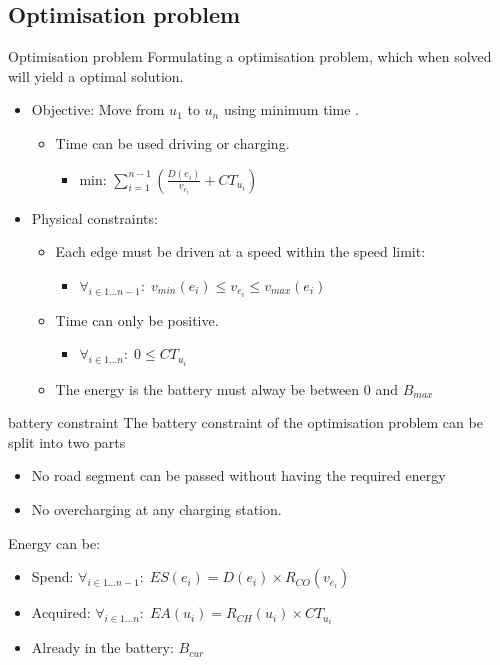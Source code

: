 \subsection{Optimisation problem}
\begin{frame}{Optimisation problem}
Formulating a optimisation problem, which when solved will yield a optimal solution. 
\begin{itemize}
\item Objective: Move from $u_1$ to $u_n$ using minimum time . 
\begin{itemize}
\item Time can be used driving or charging. 
\begin{itemize}
\item $\text{min: } \sum_{i=1}^{n-1} \left(\frac{D(e_i)}{v_{e_i}} + CT_{u_i} \right)$
\end{itemize}
\end{itemize}
\item Physical constraints:
\begin{itemize}
\item Each edge must be driven at a speed within the speed limit:\begin{itemize}
\item $\forall_{i\in1 \dots n-1 }:\;v_{min}(e_i) \leq v_{e_i} \leq v_{max}(e_i)$
\end{itemize}
\item Time can only be positive.\begin{itemize}
\item $\forall_{i\in1 \dots n }:\; 0 \leq CT_{u_i} $
\end{itemize}

\item The energy is the battery must alway be between 0 and $B_{max}$
\end{itemize}
\end{itemize} 
\end{frame}
\begin{frame}{battery constraint}
The battery constraint of the optimisation problem can be split into two parts
\begin{itemize}
\item No road segment can be passed without having the required energy
\item No overcharging at any charging station. 
\end{itemize}
Energy can be:
\begin{itemize}
\item Spend: $\forall_{i\in1 \dots n-1 }:\; ES(e_i) = D(e_i) \times R_{CO}(v_{e_i})$
\item Acquired: $\forall_{i\in1 \dots n }:\; EA(u_i) = R_{CH}(u_i) \times CT_{u_i}$
\item Already in the battery: $B_{cur}$
\end{itemize}
\end{frame}
